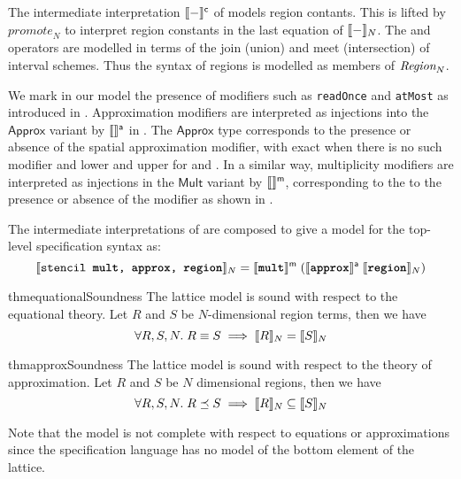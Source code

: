 The intermediate interpretation $\llbracket{} {-} \rrbracket{}^{\mathsf{c}}$ of
 models region contants. This is lifted by
$\textit{promote}_N$ to interpret region constants in the last
equation of $\llbracket{} {-} \rrbracket{}_N$. The \term{+} and \term{*} operators are
modelled in terms of the join (union) and meet (intersection) of
interval schemes. Thus the syntax of regions is modelled as members of
$\textnormal{$\textit{Region}_{N}$}$.

We mark in our model the presence of modifiers such as
\texttt{readOnce} and \texttt{atMost} as introduced in
.  Approximation modifiers are interpreted as
injections into the $\mathsf{Approx}$ variant by $\llbracket{} {} \rrbracket{}^{\textsf{a}}$ in
.  The $\textsf{Approx}$ type corresponds
to the presence or absence of the spatial approximation modifier, with
\textsf{exact} when there is no such modifier and \textsf{lower} and
\textsf{upper} for  and . In a similar way,
multiplicity modifiers are interpreted as injections in the
$\mathsf{Mult}$ variant by $\llbracket{} {} \rrbracket{}^{\textsf{m}}$, corresponding to the to
the presence or absence of the  modifier as shown in
.

\begin{defn}
The intermediate interpretations of 
are composed to give a model for the top-level specification
syntax as:
%
\begin{equation*}
  \llbracket{} {\texttt{stencil \texttt{\textbf{mult}}, \texttt{\textbf{approx}}, \texttt{\textbf{region}}}} \rrbracket{}_N =
    \llbracket{} {\texttt{\textbf{mult}}} \rrbracket{}^{\textsf{m}} \;
           {(\llbracket{} {\texttt{\textbf{approx}}} \rrbracket{}^{\textsf{a}} \;
                    {\llbracket{} {\texttt{\textbf{region}}} \rrbracket{}_N)}}
\end{equation*}
\end{defn}

\begin{restatable}{thm}{equationalSoundness}
  The lattice model is sound with respect to the equational theory. Let $R$ and $S$
  be $N$-dimensional region terms, then we have
%
  \begin{equation*}
    \forall R, S, N. \; R \equiv S \implies \llbracket{} {R} \rrbracket{}_N = \llbracket{} {S} \rrbracket{}_N
  \end{equation*}
\end{restatable}

\begin{restatable}{thm}{approxSoundness}
  The lattice model is sound with respect to the theory of approximation. Let $R$
  and $S$ be $N$ dimensional regions, then we have
%
  \begin{equation*}
    \forall R, S, N. \; R \preceq S \implies \llbracket{} {R} \rrbracket{}_N \subseteq \llbracket{} {S} \rrbracket{}_N
  \end{equation*}
\end{restatable}
%
Note that the model is not complete with respect to equations or
approximations since the specification language has no model of the
bottom element of the lattice.

